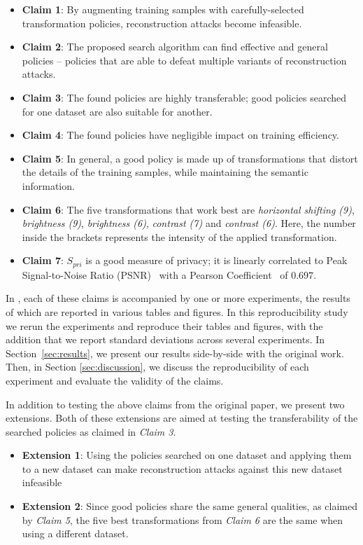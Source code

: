 \begin{itemize}[noitemsep]
\item \textbf{Claim 1}: By  augmenting training samples with carefully-selected transformation  policies,  reconstruction attacks become infeasible.
\item \textbf{Claim 2}: The proposed search algorithm can find effective and general policies -- policies that are able to defeat multiple variants of reconstruction attacks.
\item \textbf{Claim 3}: The found policies are highly transferable; good policies searched for one dataset are also suitable for another.
\item \textbf{Claim 4}: The found policies have negligible impact on training efficiency.
\item \textbf{Claim 5}: In general, a good policy is made up of transformations that distort the details of the training samples, while maintaining the semantic information.
\item \textbf{Claim 6}: The five transformations that work best are \emph{horizontal shifting (9)}, \emph{brightness (9)}, \emph{brightness (6)}, \emph{contrast (7)} and \emph{contrast (6)}. Here, the number inside the brackets represents the intensity of the applied transformation.
\item \textbf{Claim 7}: $S_{pri}$ is a good measure of privacy; it is linearly correlated to Peak Signal-to-Noise Ratio (PSNR)~\cite{hore2010} with a Pearson Coefficient~\cite{stigler1989} of $0.697$.
\end{itemize}

In \cite{gao2021privacy}, each of these claims is accompanied by one or more experiments, the results of which are reported in various tables and figures. In this reproducibility study we rerun the experiments and reproduce their tables and figures, with the addition that we report standard deviations across several experiments. In Section~\ref{sec:results}, we present our results side-by-side with the original work. Then, in Section \ref{sec:discussion}, we discuss the reproducibility of each experiment and evaluate the validity of the claims.\bigskip

In addition to testing the above claims from the original paper, we present two extensions. Both of these extensions are aimed at testing the transferability of the searched policies as claimed in \emph{Claim 3}.

\begin{itemize}[noitemsep]
    \item \textbf{Extension 1}: Using the policies searched on one dataset and applying them to a new dataset can make reconstruction attacks against this new dataset infeasible
    \item \textbf{Extension 2}: Since good policies share the same general qualities, as claimed by \emph{Claim 5}, the five best transformations from \emph{Claim 6} are the same when using a different dataset.
\end{itemize}


